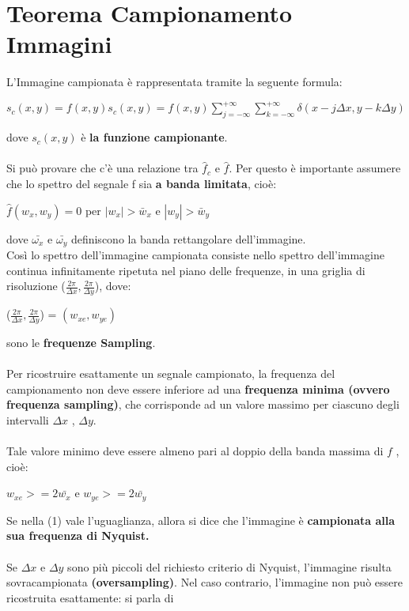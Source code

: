 \section{Teorema Campionamento Immagini}
L'Immagine campionata è rappresentata tramite la seguente formula:
\begin{center}
    $s_c(x,y) = f(x,y)s_c(x,y)=f(x,y)\sum_{j=-\infty}^{+\infty}
        \sum_{k=-\infty}^{+\infty} \delta (x-j \Delta x, y-k \Delta y)$
\end{center}
dove $s_c(x,y)$ è \textbf{la funzione campionante}. \\\\Si può provare che c’è
una relazione tra $\hat{f}_c$ e $\hat{f}$. Per questo è importante assumere che
lo spettro del segnale f sia \textbf{a banda limitata}, cioè:
\begin{center}
    $\hat{f}(w_x,w_y)=0$ per $|w_x| > \bar{w}_x$ e $|w_y| > \bar{w}_y$
\end{center}
dove $\bar{ω_x}$ e $\bar{ω_y}$ definiscono la banda rettangolare dell’immagine.
\\Così lo spettro dell’immagine campionata consiste nello spettro dell’immagine
continua infinitamente ripetuta nel piano delle frequenze, in una griglia di
risoluzione ($\frac{2\pi}{\Delta x}, \frac{2 \pi}{\Delta y}$), dove:
\begin{center}
    ($\frac{2\pi}{\Delta x}, \frac{2 \pi}{\Delta y}$) = $(w_{xe}, w_{ye})$
\end{center}
sono le \textbf{frequenze Sampling}. \\\\Per ricostruire esattamente un segnale
campionato, la frequenza del campionamento non deve essere inferiore ad una
\textbf{frequenza minima (ovvero frequenza sampling)}, che corrisponde ad un
valore massimo per ciascuno degli intervalli $\Delta x$ , $\Delta y$. \\\\Tale
valore minimo deve essere almeno pari al doppio della banda massima di $f$ ,
cioè:
\begin{center}
    $w_{xe} >= 2 \bar{w_x}$ e $w_{ye} >= 2 \bar{w_y}$
\end{center}
Se nella (1) vale l’uguaglianza, allora si dice che l’immagine è
\textbf{campionata alla sua frequenza di Nyquist.}
\\\\Se $\Delta x$ e $\Delta y$ sono più piccoli del richiesto criterio di
Nyquist, l’immagine risulta sovracampionata \textbf{(oversampling)}. Nel caso
contrario, l’immagine non può essere ricostruita esattamente: si parla di
